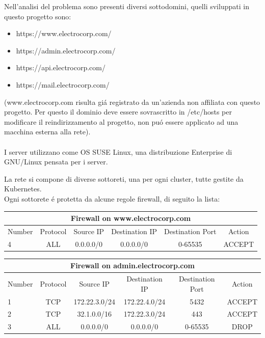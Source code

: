 Nell'analisi del problema sono presenti diversi sottodomini,  quelli sviluppati in questo progetto sono:
\begin{itemize}
    \item https://www.electrocorp.com/
    \item https://admin.electrocorp.com/
    \item https://api.electrocorp.com/
    \item https://mail.electrocorp.com/
\end{itemize}
(www.electrocorp.com risulta giá registrato da un'azienda non affiliata con questo progetto. Per questo il dominio deve essere sovrascritto in /etc/hosts per modificare il reindirizzamento al progetto, non puó essere applicato ad una macchina esterna alla rete). \\ \\
I server utilizzano come OS SUSE Linux, una distribuzione Enterprise di GNU/Linux pensata per i server.

La rete si compone di diverse sottoreti, una per ogni cluster, tutte gestite da Kubernetes. \\
Ogni sottorete é protetta da alcune regole firewall, di seguito la lista:
\begin{center}
    \begin{tabular}{ |l|c|c|c|c|c| } 
        \hline
        \multicolumn{6}{|c|}{Firewall on www.electrocorp.com} \\
        \hline
            Number & Protocol & Source IP     & Destination IP & Destination Port & Action \\
        \hline
            4      & ALL      & 0.0.0.0/0    & 0.0.0.0/0     & 0-65535          & ACCEPT \\
        \hline
    \end{tabular}
\end{center}
    
\begin{center}
    \begin{tabular}{ |l|c|c|c|c|c| } 
        \hline
        \multicolumn{6}{|c|}{Firewall on admin.electrocorp.com} \\
        \hline
            Number & Protocol & Source IP     & Destination IP & Destination Port & Action \\
        \hline
            1      & TCP      & 172.22.3.0/24 & 172.22.4.0/24  & 5432             & ACCEPT \\
            2      & TCP      & 32.1.0.0/16   & 172.22.3.0/24  & 443              & ACCEPT \\
            3      & ALL      & 0.0.0.0/0    & 0.0.0.0/0     & 0-65535          & DROP \\
        \hline
    \end{tabular}
\end{center}

